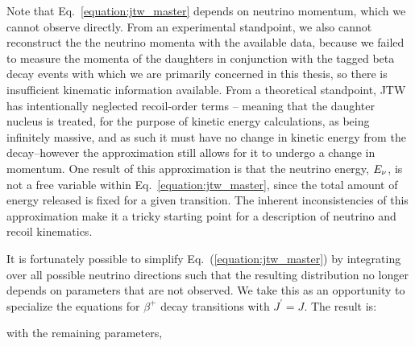 Note that Eq.~\ref{equation:jtw_master} depends on neutrino momentum, which we cannot observe directly.  
From an experimental standpoint, we also cannot reconstruct the the neutrino momenta with the available data, because we failed to measure the momenta of the daughters in conjunction with the tagged beta decay events with which we are primarily concerned in this thesis, so there is insufficient kinematic information available.   From a theoretical standpoint, JTW has intentionally neglected recoil-order terms -- meaning that the daughter nucleus is treated, for the purpose of kinetic energy calculations, as being infinitely massive, and as such it must have no change in kinetic energy from the decay--however the approximation still allows for it to undergo a change in momentum.  One result of this approximation is that the neutrino energy, $E_{\nu}$, is not a free variable within Eq.~\ref{equation:jtw_master}, since the total amount of energy released is fixed for a given transition.  The inherent inconsistencies of this approximation make it a tricky starting point for a description of neutrino and recoil kinematics.


It is fortunately possible to simplify Eq.~(\ref{equation:jtw_master}) by integrating over all possible neutrino directions %
such that the resulting distribution no longer depends on parameters that are not observed.  
%
We take this as an opportunity to specialize the equations for $\beta^+$ decay transitions with $J^\prime = J$. The result 
is:

\unskip with the remaining parameters,

